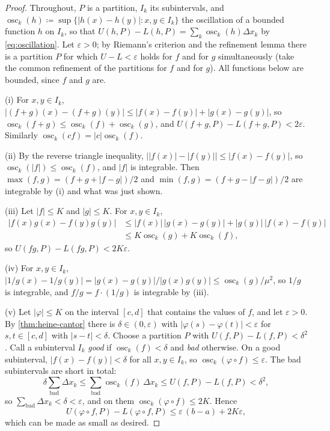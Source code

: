 \begin{proof}
Throughout, $P$ is a partition, $I_k$ its subintervals, and $\operatorname{osc}_k(h)\coloneqq\sup\{|h(x)-h(y)|: x,y\in I_k\}$ the oscillation of a bounded function $h$ on $I_k$, so that $U(h,P)-L(h,P)=\sum_k\operatorname{osc}_k(h)\Delta x_k$ by \eqref{eq:oscillation}. Let $\varepsilon>0$; by Riemann's criterion and the refinement lemma there is a partition $P$ for which $U-L<\varepsilon$ holds for $f$ and for $g$ simultaneously (take the common refinement of the partitions for $f$ and for $g$). All functions below are bounded, since $f$ and $g$ are.

(i) For $x,y\in I_k$, $|(f+g)(x)-(f+g)(y)|\le|f(x)-f(y)|+|g(x)-g(y)|$, so $\operatorname{osc}_k(f+g)\le\operatorname{osc}_k(f)+\operatorname{osc}_k(g)$, and $U(f+g,P)-L(f+g,P)<2\varepsilon$. Similarly $\operatorname{osc}_k(cf)=|c|\operatorname{osc}_k(f)$.

(ii) By the reverse triangle inequality, $\bigl||f(x)|-|f(y)|\bigr|\le|f(x)-f(y)|$, so $\operatorname{osc}_k(|f|)\le\operatorname{osc}_k(f)$, and $|f|$ is integrable. Then $\max(f,g)=(f+g+|f-g|)/2$ and $\min(f,g)=(f+g-|f-g|)/2$ are integrable by (i) and what was just shown.

(iii) Let $|f|\le K$ and $|g|\le K$. For $x,y\in I_k$,
\begin{align*}
|f(x)g(x)-f(y)g(y)|&\le|f(x)|\,|g(x)-g(y)|+|g(y)|\,|f(x)-f(y)|\\
&\le K\operatorname{osc}_k(g)+K\operatorname{osc}_k(f),
\end{align*}
so $U(fg,P)-L(fg,P)<2K\varepsilon$.

(iv) For $x,y\in I_k$, $|1/g(x)-1/g(y)|=|g(x)-g(y)|/|g(x)g(y)|\le\operatorname{osc}_k(g)/\mu^2$, so $1/g$ is integrable, and $f/g=f\cdot(1/g)$ is integrable by (iii).

(v) Let $|\varphi|\le K$ on the interval $[c,d]$ that contains the values of $f$, and let $\varepsilon>0$. By \cref{thm:heine-cantor} there is $\delta\in(0,\varepsilon)$ with $|\varphi(s)-\varphi(t)|<\varepsilon$ for $s,t\in[c,d]$ with $|s-t|<\delta$. Choose a partition $P$ with $U(f,P)-L(f,P)<\delta^2$. Call a subinterval $I_k$ \emph{good} if $\operatorname{osc}_k(f)<\delta$ and \emph{bad} otherwise. On a good subinterval, $|f(x)-f(y)|<\delta$ for all $x,y\in I_k$, so $\operatorname{osc}_k(\varphi\circ f)\le\varepsilon$. The bad subintervals are short in total:
\[
\delta\sum_{\text{bad}}\Delta x_k\le\sum_{\text{bad}}\operatorname{osc}_k(f)\,\Delta x_k\le U(f,P)-L(f,P)<\delta^2 ,
\]
so $\sum_{\text{bad}}\Delta x_k<\delta<\varepsilon$, and on them $\operatorname{osc}_k(\varphi\circ f)\le2K$. Hence
\[
U(\varphi\circ f,P)-L(\varphi\circ f,P)\le\varepsilon\,(b-a)+2K\varepsilon ,
\]
which can be made as small as desired.
\end{proof}

